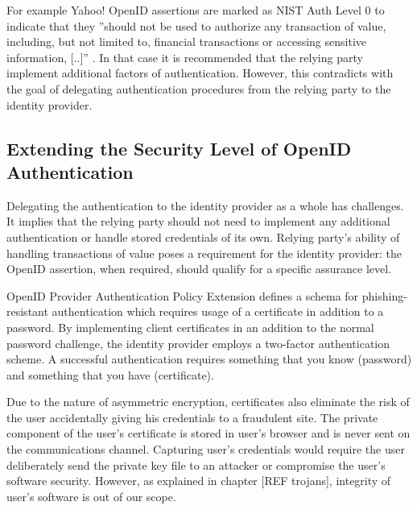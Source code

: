 \documentclass{tktltiki}
\begin{document}
   For example Yahoo! OpenID assertions are marked as NIST Auth Level 0 to indicate that they ''should not be used to authorize any transaction of value, including, but not limited to, financial transactions or accessing sensitive information, [..]'' \cite{yahoo_openid_bestpractices_2010}. In that case it is recommended that the relying party implement additional factors of authentication. However, this contradicts with the goal of delegating authentication procedures from the relying party to the identity provider.
          
    

\subsection{Extending the Security Level of OpenID Authentication}

    Delegating the authentication to the identity provider as a whole has challenges. It implies that the relying party should not need to implement any additional authentication or handle stored credentials of its own. Relying party's ability of handling transactions of value poses a requirement for the identity provider: the OpenID assertion, when required, should qualify for a specific assurance level.

    OpenID Provider Authentication Policy Extension defines a schema for phishing-resistant authentication \cite{openid_2.0_pape_phishing_07} which requires usage of a certificate in addition to a password. By implementing client certificates in an addition to the normal password challenge, the identity provider employs a two-factor authentication scheme. A successful authentication requires something that you know (password) and something that you have (certificate). 

        


    Due to the nature of asymmetric encryption, certificates also eliminate the risk of the user accidentally giving his credentials to a fraudulent site. The private component of the user's certificate is stored in user's browser and is never sent on the communications channel. Capturing user's credentials would require the user deliberately send the private key file to an attacker or compromise the user's software security. However, as explained in chapter [REF trojans], integrity of user's software is out of our scope. 
\end{document}
